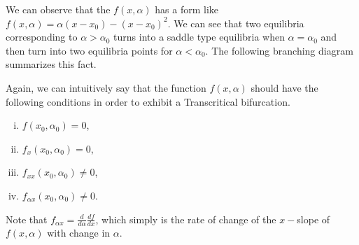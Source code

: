 

We can observe that the $f(x,\alpha)$ has a form like $f(x,\alpha) = \alpha (x-x_0) - (x-x_0)^2$. We can see that two equilibria corresponding to $\alpha>\alpha_0$ turns into a saddle type equilibria when $\alpha = \alpha_0$ and then turn into two equilibria points for $\alpha<\alpha_0$. The following branching diagram summarizes this fact.



Again, we can intuitively say that the function $f(x,\alpha)$ should have the following conditions in order to exhibit a Transcritical bifurcation.

\begin{enumerate}[(i)]
	\item $f(x_0,\alpha_0) = 0$,
	\item $f_x(x_0,\alpha_0) = 0$,
	\item $f_{xx}(x_0,\alpha_0) \neq  0$,
	\item $f_{\alpha x} (x_0,\alpha_0) \neq 0$.
\end{enumerate}
Note that $f_{\alpha x} = \frac{d}{d\alpha} \frac{df}{dx}$, which simply is the rate of change of the $x-$slope of $f(x,\alpha)$ with change in $\alpha$.

